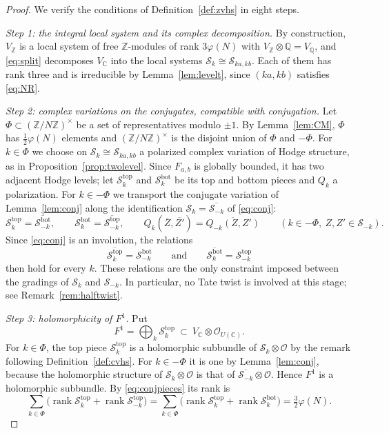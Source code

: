 \documentclass[11pt]{amsart}
\theoremstyle{definition}
\theoremstyle{remark}
\numberwithin{equation}{section}
\newcommand{\Q}{\mathbb{Q}}
\newcommand{\Z}{\mathbb{Z}}
\newcommand{\C}{\mathbb{C}}
\newcommand{\cS}{\mathcal{S}}
\newcommand{\cO}{\mathcal{O}}
\newcommand{\tp}{\mathrm{top}}
\newcommand{\bt}{\mathrm{bot}}
\DeclareMathOperator{\rank}{rank}
\newcommand{\Fab}{F_{a,b}}
\begin{document}
\begin{proof}
We verify the conditions of Definition~\ref{def:zvhs} in eight steps.

\emph{Step 1: the integral local system and its complex decomposition.} By construction, $V_\Z$ is a local system of free $\Z$-modules of rank $3\varphi(N)$ with $V_\Z\otimes\Q=V_\Q$, and \eqref{eq:split} decomposes $V_\C$ into the local systems $\cS_k\cong\cS_{ka,kb}$. Each of them has rank three and is irreducible by Lemma~\ref{lem:levelt}, since $(ka,kb)$ satisfies \eqref{eq:NR}.

\emph{Step 2: complex variations on the conjugates, compatible with conjugation.} Let $\Phi\subset(\Z/N\Z)^\times$ be a set of representatives modulo $\pm1$. By Lemma~\ref{lem:CM}, $\Phi$ has $\frac12\varphi(N)$ elements and $(\Z/N\Z)^\times$ is the disjoint union of $\Phi$ and $-\Phi$. For $k\in\Phi$ we choose on $\cS_k\cong\cS_{ka,kb}$ a polarized complex variation of Hodge structure, as in Proposition~\ref{prop:twolevel}. Since $\Fab$ is globally bounded, it has two adjacent Hodge levels; let $\cS_k^{\tp}$ and $\cS_k^{\bt}$ be its top and bottom pieces and $Q_k$ a polarization. For $k\in-\Phi$ we transport the conjugate variation of Lemma~\ref{lem:conj} along the identification $\cS_k=\overline{\cS_{-k}}$ of \eqref{eq:conj}:
\[
\cS_k^{\tp}=\overline{\cS_{-k}^{\bt}},\qquad\cS_k^{\bt}=\overline{\cS_{-k}^{\tp}},\qquad Q_k(\overline Z,\overline{Z'})=\overline{Q_{-k}(Z,Z')}\qquad(k\in-\Phi,\ Z,Z'\in\cS_{-k}).
\]
Since \eqref{eq:conj} is an involution, the relations
\begin{equation}\label{eq:conjpieces}
\overline{\cS_k^{\tp}}=\cS_{-k}^{\bt}\qquad\text{and}\qquad\overline{\cS_k^{\bt}}=\cS_{-k}^{\tp}
\end{equation}
then hold for every $k$. These relations are the only constraint imposed between the gradings of $\cS_k$ and $\cS_{-k}$. In particular, no Tate twist is involved at this stage; see Remark~\ref{rem:halftwist}.

\emph{Step 3: holomorphicity of $F^1$.} Put
\[
F^1=\bigoplus_k\cS_k^{\tp}\ \subset\ V_\C\otimes\cO_{U(\C)} .
\]
For $k\in\Phi$, the top piece $\cS_k^{\tp}$ is a holomorphic subbundle of $\cS_k\otimes\cO$ by the remark following Definition~\ref{def:cvhs}. For $k\in-\Phi$ it is one by Lemma~\ref{lem:conj}, because the holomorphic structure of $\cS_k\otimes\cO$ is that of $\overline{\cS_{-k}}\otimes\cO$. Hence $F^1$ is a holomorphic subbundle. By \eqref{eq:conjpieces} its rank is
\[
\sum_{k\in\Phi}\big(\rank\cS_k^{\tp}+\rank\cS_{-k}^{\tp}\big)=\sum_{k\in\Phi}\big(\rank\cS_k^{\tp}+\rank\cS_k^{\bt}\big)=\tfrac32\varphi(N).
\]


\end{proof}
\end{document}
